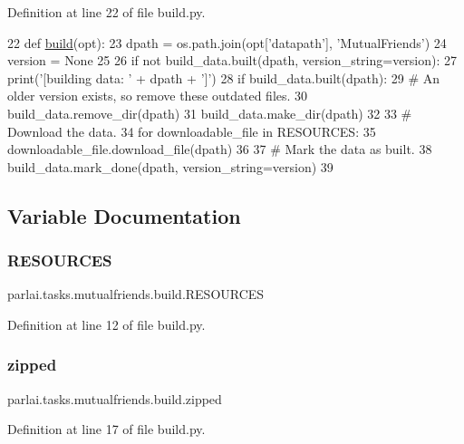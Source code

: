 Definition at line 22 of file build.\+py.


\begin{DoxyCode}
22 \textcolor{keyword}{def }\hyperlink{namespacedialog__babi__feedback_1_1build_a7a9d289f7493a5ded13c4b7f071b6184}{build}(opt):
23     dpath = os.path.join(opt[\textcolor{stringliteral}{'datapath'}], \textcolor{stringliteral}{'MutualFriends'})
24     version = \textcolor{keywordtype}{None}
25 
26     \textcolor{keywordflow}{if} \textcolor{keywordflow}{not} build\_data.built(dpath, version\_string=version):
27         print(\textcolor{stringliteral}{'[building data: '} + dpath + \textcolor{stringliteral}{']'})
28         \textcolor{keywordflow}{if} build\_data.built(dpath):
29             \textcolor{comment}{# An older version exists, so remove these outdated files.}
30             build\_data.remove\_dir(dpath)
31         build\_data.make\_dir(dpath)
32 
33         \textcolor{comment}{# Download the data.}
34         \textcolor{keywordflow}{for} downloadable\_file \textcolor{keywordflow}{in} RESOURCES:
35             downloadable\_file.download\_file(dpath)
36 
37         \textcolor{comment}{# Mark the data as built.}
38         build\_data.mark\_done(dpath, version\_string=version)
39 \end{DoxyCode}


\subsection{Variable Documentation}
\mbox{\label{namespaceparlai_1_1tasks_1_1mutualfriends_1_1build_a3f910f7699f7aa46c45ca749f51c0177}} 
\subsubsection{\texorpdfstring{R\+E\+S\+O\+U\+R\+C\+ES}{RESOURCES}}
{\footnotesize\ttfamily parlai.\+tasks.\+mutualfriends.\+build.\+R\+E\+S\+O\+U\+R\+C\+ES}



Definition at line 12 of file build.\+py.

\mbox{\label{namespaceparlai_1_1tasks_1_1mutualfriends_1_1build_a5ae9c65997047901b6bc995b836f4abb}} 
\subsubsection{\texorpdfstring{zipped}{zipped}}
{\footnotesize\ttfamily parlai.\+tasks.\+mutualfriends.\+build.\+zipped}



Definition at line 17 of file build.\+py.

